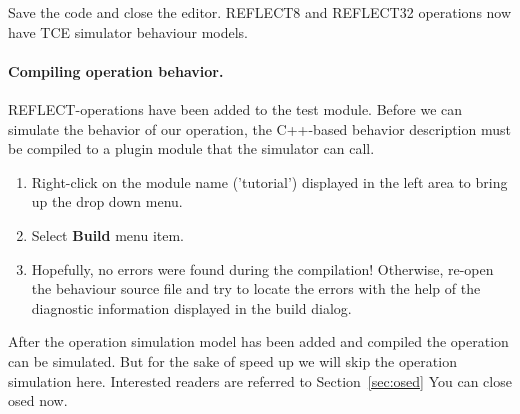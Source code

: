 \documentclass[twoside]{tceusermanual}
\begin{document}
Save the code and close the editor. REFLECT8 and REFLECT32 operations
now have TCE simulator behaviour models.

\paragraph{Compiling operation behavior.} REFLECT-operations have been
added to the test module. Before we can simulate the behavior of our
operation, the C++-based behavior description must be compiled to a plugin
module that the simulator can call.

\begin{enumerate}
\item%
  Right-click on the module name ('tutorial') displayed in the left area to bring up the
  drop down menu.
\item%
  Select \textbf{Build} menu item. 
\item%
  Hopefully, no errors were found during the compilation! Otherwise, re-open
  the behaviour source file and try to locate the errors with the
  help of the diagnostic information displayed in the build dialog.
\end{enumerate}

After the operation simulation model has been added and compiled the operation
can be simulated. But for the sake of speed up we will skip the operation
simulation here. Interested readers are referred to Section~\ref{sec:osed}
You can close osed now.

% 
\end{document}
